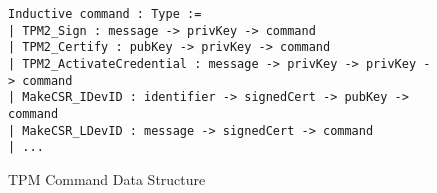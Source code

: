 \documentclass[runningheads]{llncs}
\begin{document}
\begin{figure}[hbtp]
\vspace{-\medskipamount}
\vspace{-\medskipamount}
  \begin{footnotesize}
\begin{lstlisting}[language=Coq]
Inductive command : Type :=
| TPM2_Sign : message -> privKey -> command
| TPM2_Certify : pubKey -> privKey -> command
| TPM2_ActivateCredential : message -> privKey -> privKey -> command
| MakeCSR_IDevID : identifier -> signedCert -> pubKey -> command
| MakeCSR_LDevID : message -> signedCert -> command
| ...
\end{lstlisting}
\end{footnotesize}
\vspace{-\medskipamount}
\caption{TPM Command Data Structure}
\label{fig:command-model}
\end{figure}



\end{document}
